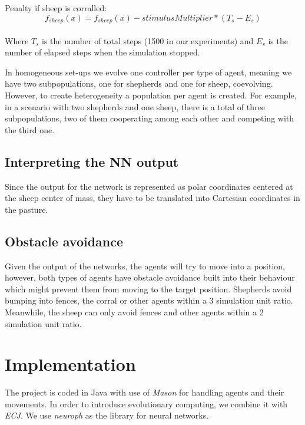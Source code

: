 \documentclass[conference]{IEEEtran}
\begin{document}
Penalty if sheep is corralled:
$$ f_{sheep}(x) = f_{sheep}(x) - stimulusMultiplier * (T_s - E_s) $$\\
Where $T_s$ is the number of total steps (1500 in our experiments) and $E_s$ is the number of elapsed steps when the simulation stopped.

In homogeneous set-ups we evolve one controller per type of agent, meaning we have two subpopulations, one for shepherds and one for sheep, coevolving. However, to create heterogeneity a population per agent is created. For example, in a scenario with two shepherds and one sheep, there is a total of three subpopulations, two of them cooperating among each other and competing with the third one.  

\subsection{Interpreting the NN output}
Since the output for the network is represented as polar coordinates centered at the sheep center of mass, they have to be translated into Cartesian coordinates in the pasture. 

\subsection{Obstacle avoidance}
Given the output of the networks, the agents will try to move into a position, however, both types of agents have obstacle avoidance built into their behaviour which might prevent them from moving to the target position. Shepherds avoid bumping into fences, the corral or other agents within a 3 simulation unit ratio. Meanwhile, the sheep can only avoid fences and other agents within a 2 simulation unit ratio. 


\section{Implementation}
The project is coded in Java with use of \textit{Mason} for handling agents and their movements. In order to introduce evolutionary computing, we combine it with \textit{ECJ}. We use \textit{neuroph} as the library for neural networks. 
\end{document}
